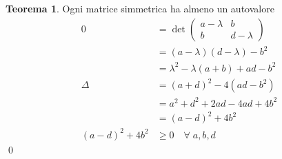 \documentclass[10pt,a4paper]{article}
\theoremstyle{plain}
\theoremstyle{definition}
\newtheorem{teorema}[subsection]{Teorema}
\begin{document}
\begin{teorema}
	Ogni matrice simmetrica ha almeno un autovalore \\
	\begin{align*}
		0&=\det{\begin{pmatrix}
			a-\lambda & b \\ b & d-\lambda
			\end{pmatrix}}
		\\
		&=(a-\lambda)(d-\lambda)-b^2\\
		&=\lambda^2 -\lambda(a+b) +ad -b^2 \\
		\Delta&=(a+d)^2-4(ad-b^2) \\
		&=a^2+d^2+2ad-4ad+4b^2\\
		&=(a-d)^2 + 4b^2\\
		(a-d)^2 + 4b^2 &\ge 0 \quad \forall \; a,b,d
	\end{align*}
	\qed
\end{teorema}
\end{document}
